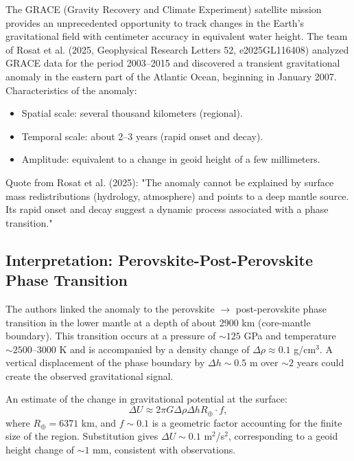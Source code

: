 \documentclass[12pt]{article}
\theoremstyle{remark}
\begin{document}
	The GRACE (Gravity Recovery and Climate Experiment) satellite mission provides an unprecedented opportunity to track changes in the Earth's gravitational field with centimeter accuracy in equivalent water height. The team of Rosat et al. (2025, Geophysical Research Letters 52, e2025GL116408) analyzed GRACE data for the period 2003–2015 and discovered a transient gravitational anomaly in the eastern part of the Atlantic Ocean, beginning in January 2007. Characteristics of the anomaly:
	\begin{itemize}
		\item Spatial scale: several thousand kilometers (regional).
		\item Temporal scale: about 2–3 years (rapid onset and decay).
		\item Amplitude: equivalent to a change in geoid height of a few millimeters.
	\end{itemize}
	Quote from Rosat et al. (2025): "The anomaly cannot be explained by surface mass redistributions (hydrology, atmosphere) and points to a deep mantle source. Its rapid onset and decay suggest a dynamic process associated with a phase transition."
	
	\subsection{Interpretation: Perovskite-Post-Perovskite Phase Transition}
	\label{subsec:grace-interpretation}
	
	The authors linked the anomaly to the perovskite $\rightarrow$ post-perovskite phase transition in the lower mantle at a depth of about 2900 km (core-mantle boundary). This transition occurs at a pressure of $\sim 125$ GPa and temperature $\sim 2500$–$3000$ K and is accompanied by a density change of $\Delta\rho \approx 0.1$ g/cm$^3$. A vertical displacement of the phase boundary by $\Delta h \sim 0.5$ m over $\sim 2$ years could create the observed gravitational signal.
	
	An estimate of the change in gravitational potential at the surface:
	\begin{equation}
		\Delta U \approx 2\pi G \Delta\rho \Delta h R_\oplus \cdot f,
		\label{eq:delta-u}
	\end{equation}
	where $R_\oplus = 6371$ km, and $f \sim 0.1$ is a geometric factor accounting for the finite size of the region. Substitution gives $\Delta U \sim 0.1$ m$^2$/s$^2$, corresponding to a geoid height change of $\sim 1$ mm, consistent with observations.
	
\end{document}
